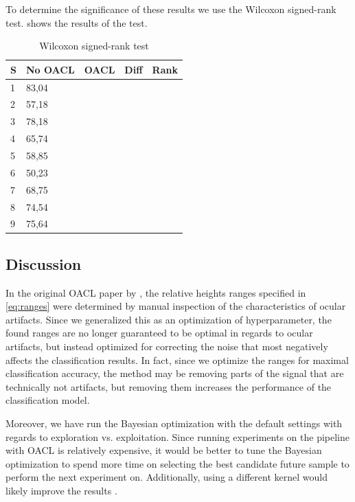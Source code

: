 To determine the significance of these results we use the Wilcoxon signed-rank test.  shows the results of the test.

\begin{table}[H]
	\centering
	\caption{Wilcoxon signed-rank test}
	\label{fig:wilcoxon}
	\begin{tabular}{@{}l|llll@{}}
		\toprule
		S & No OACL & OACL & Diff & Rank \\ \midrule
		1 &   83,04            &                 &      &      \\
		2 &   57,18            &                 &      &      \\
		3 &   78,18            &                 &      &      \\
		4 &   65,74            &                 &      &      \\
		5 &   58,85            &                 &      &      \\
		6 &   50,23            &                 &      &      \\
		7 &   68,75            &                 &      &      \\
		8 &   74,54            &                 &      &      \\
		9 &   75,64            &                 &      &      \\ \bottomrule
	\end{tabular}
\end{table}

\subsection{Discussion}\label{sec:discussion}
In the original OACL paper by \citep{li2015ocular}, the relative heights ranges specified in \cref{eq:ranges} were determined by manual inspection of the characteristics of ocular artifacts. Since we generalized this as an optimization of hyperparameter, the found ranges are no longer guaranteed to be optimal in regards to ocular artifacts, but instead optimized for correcting the noise that most negatively affects the classification results. In fact, since we optimize the ranges for maximal classification accuracy, the method may be removing parts of the signal that are technically not artifacts, but removing them increases the performance of the classification model.

Moreover, we have run the Bayesian optimization with the default settings with regards to exploration vs. exploitation. Since running experiments on the pipeline with OACL is relatively expensive, it would be better to tune the Bayesian optimization to spend more time on selecting the best candidate future sample to perform the next experiment on. Additionally, using a different kernel would likely improve the results \citep{snoek2012practical}.

